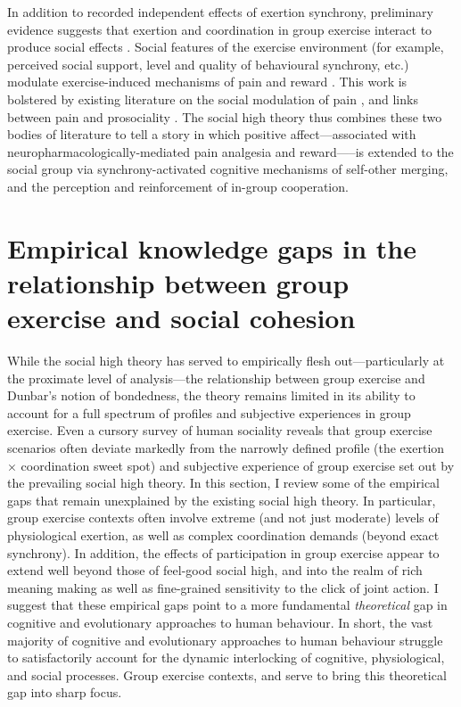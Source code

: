 \begin{CJK}{UTF8}{gbsn}
In addition to recorded independent effects of exertion synchrony,  preliminary evidence suggests that exertion and coordination in group exercise interact to produce social effects \citep{Jackson2018}.  Social features of the exercise environment (for example, perceived social support, level and quality of behavioural synchrony, etc.) modulate exercise-induced mechanisms of pain and reward \citep{Cohen2009,Sullivan2014,Tarr2015,Davis2015,Weinstein2016}. This work is bolstered by existing literature on the social modulation of pain \citep{Eisenberger2012a}, and links between pain and prosociality \citep{Bastian2014a}.  The social high theory thus combines these two bodies of literature to tell a story in which positive affect---associated with neuropharmacologically-mediated pain analgesia and reward—--is extended to the social group via synchrony-activated cognitive mechanisms of self-other merging, and the perception and reinforcement of in-group cooperation.


\section{Empirical knowledge gaps in the relationship between group exercise and social cohesion\label{sect:empKnowGaps}}
While the social high theory has served to empirically flesh out---particularly at the proximate level of analysis---the relationship between group exercise and Dunbar's notion of bondedness, the theory remains limited in its ability to account for a full spectrum of profiles and subjective experiences in group exercise.
Even a cursory survey of human sociality reveals that group exercise scenarios often deviate markedly from the narrowly defined profile (the exertion $\times$ coordination sweet spot) and subjective experience of group exercise set out by the prevailing social high theory.  In this section, I review some of the empirical gaps that remain unexplained by the existing social high theory.  In particular, group exercise contexts often involve extreme (and not just moderate) levels of physiological exertion, as well as complex coordination demands (beyond exact synchrony).  In addition, the effects of participation in group exercise appear to extend well beyond those of feel-good social high, and into the realm of rich meaning making as well as fine-grained sensitivity to the click of joint action.  I suggest that these empirical gaps point to a more fundamental \textit{theoretical} gap in cognitive and evolutionary approaches to human behaviour. In short, the vast majority of cognitive and evolutionary approaches to human behaviour struggle to satisfactorily account for the dynamic interlocking of cognitive, physiological, and social processes.  Group exercise contexts, and serve to bring this theoretical gap into sharp focus.


\end{CJK}
